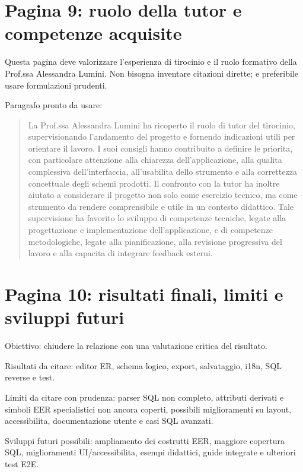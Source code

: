 \section{Pagina 9: ruolo della tutor e competenze acquisite}

Questa pagina deve valorizzare l'esperienza di tirocinio e il ruolo formativo della Prof.ssa Alessandra Lumini. Non bisogna inventare citazioni dirette; e preferibile usare formulazioni prudenti.

Paragrafo pronto da usare:

\begin{quote}
La Prof.ssa Alessandra Lumini ha ricoperto il ruolo di tutor del tirocinio, supervisionando l'andamento del progetto e fornendo indicazioni utili per orientare il lavoro. I suoi consigli hanno contribuito a definire le priorita, con particolare attenzione alla chiarezza dell'applicazione, alla qualita complessiva dell'interfaccia, all'usabilita dello strumento e alla correttezza concettuale degli schemi prodotti. Il confronto con la tutor ha inoltre aiutato a considerare il progetto non solo come esercizio tecnico, ma come strumento da rendere comprensibile e utile in un contesto didattico. Tale supervisione ha favorito lo sviluppo di competenze tecniche, legate alla progettazione e implementazione dell'applicazione, e di competenze metodologiche, legate alla pianificazione, alla revisione progressiva del lavoro e alla capacita di integrare feedback esterni.
\end{quote}

\section{Pagina 10: risultati finali, limiti e sviluppi futuri}

Obiettivo: chiudere la relazione con una valutazione critica del risultato.

Risultati da citare: editor ER, schema logico, export, salvataggio, i18n, SQL reverse e test.

Limiti da citare con prudenza: parser SQL non completo, attributi derivati e simboli EER specialistici non ancora coperti, possibili miglioramenti su layout, accessibilita, documentazione utente e casi SQL avanzati.

Sviluppi futuri possibili: ampliamento dei costrutti EER, maggiore copertura SQL, miglioramenti UI/accessibilita, esempi didattici, guide integrate e ulteriori test E2E.
